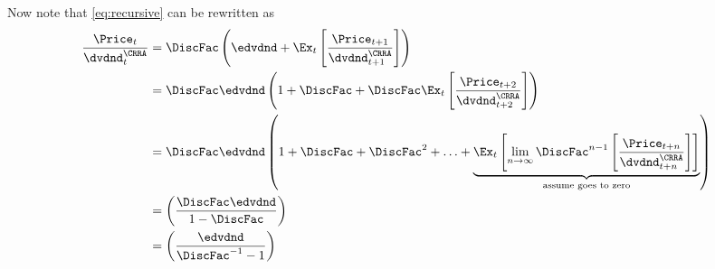 \documentclass{\handout}
\begin{document}
Now note that \eqref{eq:recursive} can be rewritten as
\begin{equation}\begin{gathered}\begin{aligned}
  \frac{\Price_{t}}{\dvdnd_{t}^{\CRRA}}          & =  \DiscFac \left( \edvdnd + \Ex_{t}\left[\frac{\Price_{t+1}}{\dvdnd_{t+1}^{\CRRA}}\right] \right) 
\\ & =  \DiscFac \edvdnd \left(1 + \DiscFac + \DiscFac \Ex_{t}\left[\frac{\Price_{t+2}}{\dvdnd_{t+2}^{\CRRA}}\right]\right) 
\\ & =  \DiscFac \edvdnd \left(1 + \DiscFac  + \DiscFac^{2} + \ldots + \underbrace{\Ex_{t} \left[\lim_{n\rightarrow \infty}\DiscFac^{n-1}\left[\frac{\Price_{t+n}}{\dvdnd_{t+n}^{\CRRA}}\right]\right]}_{\text{assume goes to zero}}\right) 
\\ & =  \left(\frac{\DiscFac \edvdnd}{1-\DiscFac}\right)
\\ & =  \left(\frac{\edvdnd}{\DiscFac^{-1}-1}\right) \label{eq:PtCRRA}
\end{aligned}\end{gathered}\end{equation}
\end{document}
